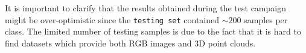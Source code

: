 \documentclass[11pt,a4paper]{article}
\begin{document}
\begin{figure}[H]
    \hspace*{-1cm}
    \qquad
\end{figure}
\noindent
It is important to clarify that the results obtained during the test campaign might be over-optimistic since the \texttt{testing set} contained $\sim 200$ samples per class. The limited number of testing samples is due to the fact that it is hard to find datasets which provide both RGB images and 3D point clouds.
\end{document}
